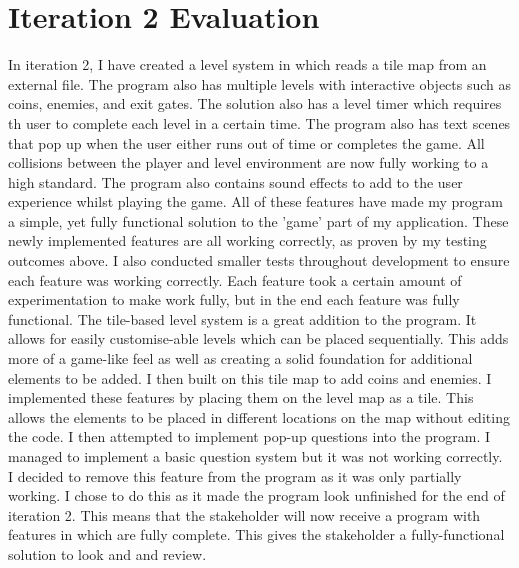 \documentclass[12pt]{report}
\begin{document}
\section{Iteration 2 Evaluation}
In iteration 2, I have created a level system in which reads a tile map from an external file. The program also has multiple levels with interactive objects such as coins, enemies, and exit gates. The solution also has a level timer which requires th user to complete each level in a certain time. The program also has text scenes that pop up when the user either runs out of time or completes the game. All collisions between the player and level environment are now fully working to a high standard. The program also contains sound effects to add to the user experience whilst playing the game. All of these features have made my program a simple, yet fully functional solution to the 'game' part of my application. 
\newline
\newline
These newly implemented features are all working correctly, as proven by my testing outcomes above. I also conducted smaller tests throughout development to ensure each feature was working correctly. Each feature took a certain amount of experimentation to make work fully, but in the end each feature was fully functional.
\newline
\newline
The tile-based level system is a great addition to the program. It allows for easily customise-able levels which can be placed sequentially. This adds more of a game-like feel as well as creating a solid foundation for additional elements to be added.
\newline
\newline
I then built on this tile map to add coins and enemies. I implemented these features by placing them on the level map as a tile. This allows the elements to be placed in different locations on the map without editing the code.
\newline
\newline
I then attempted to implement pop-up questions into the program. I managed to implement a basic question system but it was not working correctly. I decided to remove this feature from the program as it was only partially working. I chose to do this as it made the program look unfinished for the end of iteration 2. This means that the stakeholder will now receive a program with features in which are fully complete. This gives the stakeholder a fully-functional solution to look and and review. 
\end{document}
